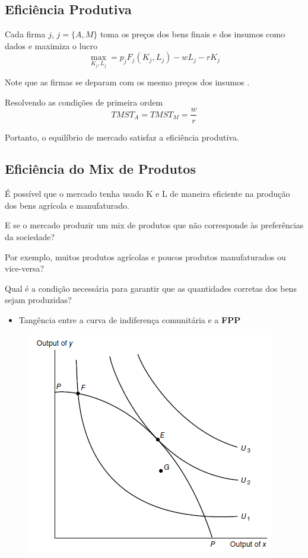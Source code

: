 \documentclass[a4paper,12pt]{article}[abntex2]
\begin{document}
\subsection{\textbf{Eficiência Produtiva}}

Cada firma $j$, $j=\{A,M\}$ toma os preços dos bens finais e dos insumos como dados e maximiza o lucro
\[
\max_{K_j,L_j}=p_jF_j(K_j,L_j)-wL_j-rK_j
\]

Note que as firmas se deparam com os mesmo preços dos insumos .

Resolvendo as condições de primeira ordem 
\[
TMST_A=TMST_M=\frac{w}{r}
\]

Portanto, o equilíbrio de mercado satisfaz a eficiência produtiva. 

\subsection{\textbf{Eficiência do Mix de Produtos}}
É possível que o mercado tenha usado K e L  de maneira eficiente na produção dos bens agrícola e manufaturado.

E se o mercado produzir um mix de produtos que não corresponde às preferências da sociedade?

Por exemplo, muitos produtos agrícolas e poucos produtos manufaturados ou vice-versa?

Qual é a condição necessária para garantir que as quantidades corretas dos bens sejam produzidas?\begin{itemize}
    \item Tangência entre a curva de indiferença comunitária e a \textbf{FPP}
\end{itemize}

\begin{figure}[H]
    \centering
    \includegraphics[width=0.70\linewidth]{Imagens/a3i5.png}
\end{figure}
\end{document}
